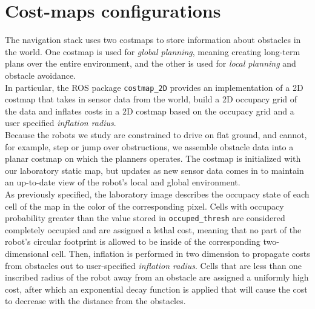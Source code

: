 \section{Cost-maps configurations}
The navigation stack uses two costmaps to store information about obstacles in the world.
One costmap is used for \textit{global planning}, meaning creating long-term plans 
over the entire environment, and the other is used for \textit{local planning} and 
obstacle avoidance.
\\
In particular, the ROS package \texttt{costmap\_2D} provides an implementation
of a 2D costmap that takes in sensor data from the world, build a 2D occupacy 
grid of the data and inflates costs in a 2D costmap based on the occupacy grid 
and a user specified \textit{inflation radius}.
\\
Because the robots we study are constrained to drive on flat ground, and
cannot, for example, step or jump over obstructions, we assemble obstacle
data into a planar costmap on which the planners operates. The costmap is
initialized with our laboratory static map, but updates as new sensor data comes in
to maintain an up-to-date view of the robot’s local and global environment.
\\
As previously specified, the laboratory image describes the occupacy state of each 
cell of the map in the color of the corresponding pixel. Cells with occupacy 
probability greater than the value stored in \texttt{occuped\_thresh} are considered
completely occupied and are assigned a lethal cost, meaning that no part of the 
robot's circular footprint is allowed to be inside of the corresponding two-dimensional cell.
Then, inflation is performed in two dimension to propagate costs from obstacles out 
to user-specified \textit{inflation radius}. Cells that are less than one inscribed
radius of the robot away from an obstacle are assigned a uniformly high cost, after 
which an exponential decay function is applied that will cause the cost to decrease 
with the distance from the obstacles.

